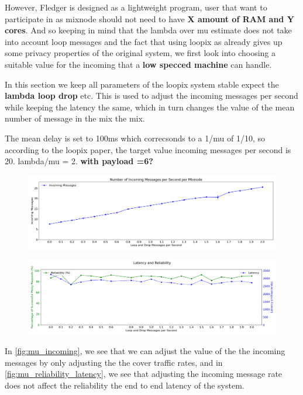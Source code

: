 \documentclass[a4paper,11pt,oneside]{report}
\begin{document}
However, Fledger is designed as a lightweight program, user that want to participate in as mixnode should not need to have \textbf{X amount of RAM and Y cores}. And so keeping in mind that the lambda over mu estimate does not take into account loop messages and the fact that using loopix as already gives up some privacy properties of the original system, we first look into choosing a suitable value for the incoming that a \textbf{low specced machine} can handle.

In this section we keep all parameters of the loopix system stable expect the \textbf{lambda loop drop} etc. This is used to adjust the incoming messages per second while keeping the latency the same, which in turn changes the value of the mean number of message in the mix the mix.

The mean delay is set to 100ms which correcsonds to a 1/mu of 1/10, so according to the loopix paper, the target value incoming messages per second is 20. lambda/mu = 2. \textbf{with payload =6?}

\begin{figure}[htbp]
    \centering
    \includegraphics[width=\textwidth]{plots/mu_incoming_messages.png}
    \caption{}
    \label{fig:mu_incoming}
\end{figure}

\begin{figure}[htbp]
    \centering
    \includegraphics[width=\textwidth]{plots/mu_reliability_latency.png}
    \caption{}
    \label{fig:mu_reliability_latency}
\end{figure}

In \autoref{fig:mu_incoming}, we see that we can adjust the value of the the incoming messages by only adjusting the the cover traffic rates, and in \autoref{fig:mu_reliability_latency}, we see that adjusting the incoming message rate does not affect the reliability the end to end latency of the system.
\end{document}

